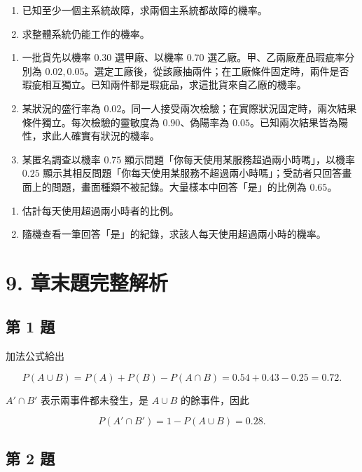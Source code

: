 \documentclass[11pt,a4paper]{article}
\begin{document}
\begin{enumerate}
\def\labelenumi{(\arabic{enumi})}
\item
  已知至少一個主系統故障，求兩個主系統都故障的機率。
\item
  求整體系統仍能工作的機率。
\end{enumerate}

\begin{enumerate}
\def\labelenumi{\arabic{enumi}.}
\setcounter{enumi}{13}
\item
  一批貨先以機率 \(0.30\) 選甲廠、以機率 \(0.70\) 選乙廠。甲、乙兩廠產品瑕疵率分別為 \(0.02,0.05\)。選定工廠後，從該廠抽兩件；在工廠條件固定時，兩件是否瑕疵相互獨立。已知兩件都是瑕疵品，求這批貨來自乙廠的機率。
\item
  某狀況的盛行率為 \(0.02\)。同一人接受兩次檢驗；在實際狀況固定時，兩次結果條件獨立。每次檢驗的靈敏度為 \(0.90\)、偽陽率為 \(0.05\)。已知兩次結果皆為陽性，求此人確實有狀況的機率。
\item
  某匿名調查以機率 \(0.75\) 顯示問題「你每天使用某服務超過兩小時嗎」，以機率 \(0.25\) 顯示其相反問題「你每天使用某服務不超過兩小時嗎」；受訪者只回答畫面上的問題，畫面種類不被記錄。大量樣本中回答「是」的比例為 \(0.65\)。
\end{enumerate}

\begin{enumerate}
\def\labelenumi{(\arabic{enumi})}
\item
  估計每天使用超過兩小時者的比例。
\item
  隨機查看一筆回答「是」的紀錄，求該人每天使用超過兩小時的機率。
\end{enumerate}

\section{9. 章末題完整解析}\label{ux7ae0ux672bux984cux5b8cux6574ux89e3ux6790}

\subsection{第 1 題}\label{ux7b2c-1-ux984c}

加法公式給出

\[
P(A\cup B)=P(A)+P(B)-P(A\cap B)
=0.54+0.43-0.25
=\boxed{0.72}.
\]

\(A'\cap B'\) 表示兩事件都未發生，是 \(A\cup B\) 的餘事件，因此

\[
P(A'\cap B')=1-P(A\cup B)=\boxed{0.28}.
\]

\subsection{第 2 題}\label{ux7b2c-2-ux984c}
\end{document}
